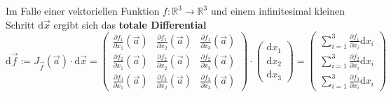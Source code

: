 \documentclass{article}
\newcommand{\diff}{\mathrm{d}}
\begin{document}
Im Falle einer vektoriellen Funktion $f:\mathbb{R}^3\to\mathbb{R}^3$ und einem infinitesimal kleinen Schritt $\diff \vec{x}$ ergibt sich das \textbf{totale Differential}
	\begin{equation}
		\diff\vec{f} := J_{\vec{f}}(\vec{a})\cdot\diff\vec{x} =
		\begin{pmatrix}
			\frac{\partial f_1}{\partial x_1}(\vec{a}) & \frac{\partial f_1}{\partial x_2}(\vec{a}) & \frac{\partial f_1}{\partial x_3}(\vec{a}) \\
			\frac{\partial f_2}{\partial x_1}(\vec{a}) & \frac{\partial f_2}{\partial x_2}(\vec{a}) & \frac{\partial f_2}{\partial x_3}(\vec{a}) \\
			\frac{\partial f_3}{\partial x_1}(\vec{a}) & \frac{\partial f_3}{\partial x_2}(\vec{a}) & \frac{\partial f_3}{\partial x_3}(\vec{a})
		\end{pmatrix}
		\cdot
		\begin{pmatrix}
			\diff x_1 \\ \diff x_2 \\ \diff x_3
		\end{pmatrix}
		=
		\begin{pmatrix}
			\sum_{i=1}^3 \frac{\partial f_1}{\partial x_i} \diff x_i\\
			\sum_{i=1}^3 \frac{\partial f_2}{\partial x_i} \diff x_i\\
			\sum_{i=1}^3 \frac{\partial f_3}{\partial x_i} \diff x_i
		\end{pmatrix}
	\end{equation}



%


\newpage
\end{document}
